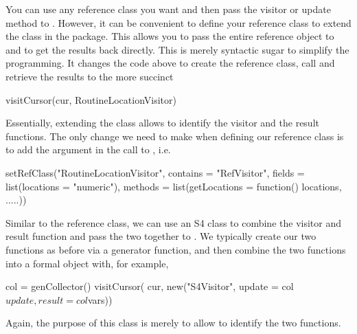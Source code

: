 You can use any reference class you want and then pass the visitor or
update method to .  However, it can be convenient to
define your reference class to extend the  class in
the  package. This allows you to pass the entire
reference object to  and to get the results back
directly. This is merely syntactic sugar to simplify the
programming. It changes the code above to create the reference class,
call  and retrieve the results to the more succinct
\begin{RCode}
visitCursor(cur, RoutineLocationVisitor)
\end{RCode}
Essentially, extending the  class allows
 to identify the visitor and the result functions.
The only change we need to make when defining our reference class
is to add the  argument in the call to
, i.e.
\begin{RCode}
setRefClass("RoutineLocationVisitor",
            contains = "RefVisitor",
            fields = list(locations = "numeric"),
            methods = list(getLocations = function() locations,
                       .....))
\end{RCode}



Similar to the reference class, we can use an S4 class
 to combine the visitor and result function
and pass the two together to .
We typically create our two functions as before
via a generator function, and then combine the two 
functions into a formal object with, for example,
\begin{RCode}
col = genCollector()
visitCursor( cur, new("S4Visitor",  update = col$update, result = col$vars))
\end{RCode}
Again, the purpose of this  class is merely to 
allow  to identify the two functions.

